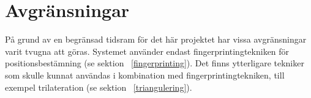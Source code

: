 \documentclass[a4paper,12pt]{article}
\begin{document}



 \section{Avgränsningar}
 På grund av en begränsad tidsram för det här projektet har vissa avgränsningar varit tvugna att göras. Systemet använder endast fingerprintingtekniken för positionsbestämning (se sektion ~\ref{fingerprinting}). Det finns ytterligare tekniker som skulle kunnat användas i kombination med fingerprintingtekniken, till exempel trilateration (se sektion ~\ref{triangulering}).
\end{document}
